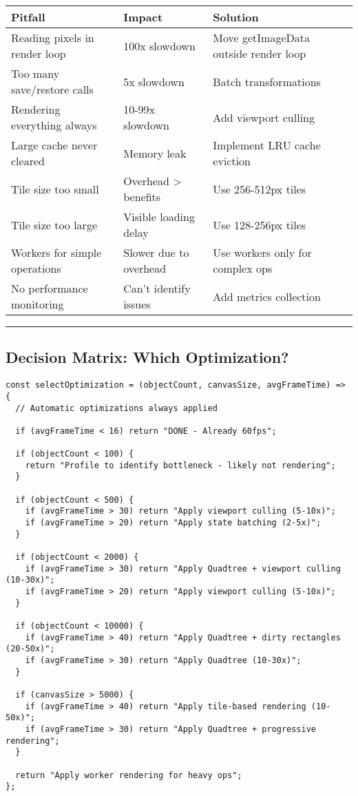 \documentclass[11pt]{article}
\begin{document}
\begin{center}
\begin{tabular}{lll}
Pitfall & Impact & Solution\\
\hline
Reading pixels in render loop & 100x slowdown & Move getImageData outside render loop\\
Too many save/restore calls & 5x slowdown & Batch transformations\\
Rendering everything always & 10-99x slowdown & Add viewport culling\\
Large cache never cleared & Memory leak & Implement LRU cache eviction\\
Tile size too small & Overhead > benefits & Use 256-512px tiles\\
Tile size too large & Visible loading delay & Use 128-256px tiles\\
Workers for simple operations & Slower due to overhead & Use workers only for complex ops\\
No performance monitoring & Can't identify issues & Add metrics collection\\
\end{tabular}
\end{center}

\noindent\rule{\textwidth}{0.5pt}
\subsection{Decision Matrix: Which Optimization?}
\label{sec:org8b32317}

\begin{verbatim}
const selectOptimization = (objectCount, canvasSize, avgFrameTime) => {
  // Automatic optimizations always applied
  
  if (avgFrameTime < 16) return "DONE - Already 60fps";
  
  if (objectCount < 100) {
    return "Profile to identify bottleneck - likely not rendering";
  }
  
  if (objectCount < 500) {
    if (avgFrameTime > 30) return "Apply viewport culling (5-10x)";
    if (avgFrameTime > 20) return "Apply state batching (2-5x)";
  }
  
  if (objectCount < 2000) {
    if (avgFrameTime > 30) return "Apply Quadtree + viewport culling (10-30x)";
    if (avgFrameTime > 20) return "Apply viewport culling (5-10x)";
  }
  
  if (objectCount < 10000) {
    if (avgFrameTime > 40) return "Apply Quadtree + dirty rectangles (20-50x)";
    if (avgFrameTime > 30) return "Apply Quadtree (10-30x)";
  }
  
  if (canvasSize > 5000) {
    if (avgFrameTime > 40) return "Apply tile-based rendering (10-50x)";
    if (avgFrameTime > 30) return "Apply Quadtree + progressive rendering";
  }
  
  return "Apply worker rendering for heavy ops";
};
\end{verbatim}
\end{document}
